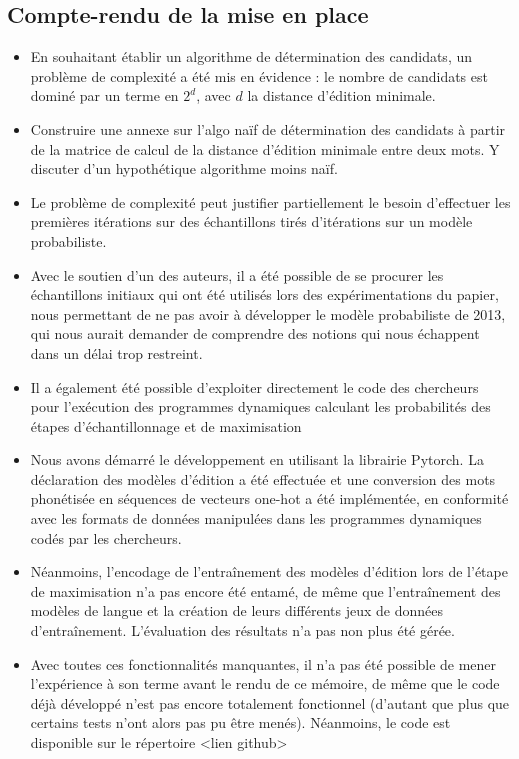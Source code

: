 \documentclass[12pt, french, twoside]{report}
\begin{document}
\subsection{Compte-rendu de la mise en place}
\begin{itemize}
    \item En souhaitant établir un algorithme de détermination des candidats, un problème de complexité a été mis en évidence : le nombre de candidats est dominé par un terme en $2^d$, avec $d$ la distance d'édition minimale.
    \item Construire une annexe sur l'algo naïf de détermination des candidats à partir de la matrice de calcul de la distance d'édition minimale entre deux mots. Y discuter d'un hypothétique algorithme moins naïf.
    \item Le problème de complexité peut justifier partiellement le besoin d'effectuer les premières itérations sur des échantillons tirés d'itérations sur un modèle probabiliste.
    \item Avec le soutien d'un des auteurs, il a été possible de se procurer les échantillons initiaux qui ont été utilisés lors des expérimentations du papier, nous permettant de ne pas avoir à développer le modèle probabiliste de 2013, qui nous aurait demander de comprendre des notions qui nous échappent dans un délai trop restreint.
    \item Il a également été possible d'exploiter directement le code des chercheurs pour l'exécution des programmes dynamiques calculant les probabilités des étapes d'échantillonnage et de maximisation
    \item Nous avons démarré le développement en utilisant la librairie Pytorch. La déclaration des modèles d'édition a été effectuée et une conversion des mots phonétisée en séquences de vecteurs one-hot a été implémentée, en conformité avec les formats de données manipulées dans les programmes dynamiques codés par les chercheurs.
    \item Néanmoins, l'encodage de l'entraînement des modèles d'édition lors de l'étape de maximisation n'a pas encore été entamé, de même que l'entraînement des modèles de langue et la création de leurs différents jeux de données d'entraînement. L'évaluation des résultats n'a pas non plus été gérée.
    \item Avec toutes ces fonctionnalités manquantes, il n'a pas été possible de mener l'expérience à son terme avant le rendu de ce mémoire, de même que le code déjà développé n'est pas encore totalement fonctionnel (d'autant que plus que certains tests n'ont alors pas pu être menés). Néanmoins, le code est disponible sur le répertoire <lien github>
\end{itemize}
\end{document}
